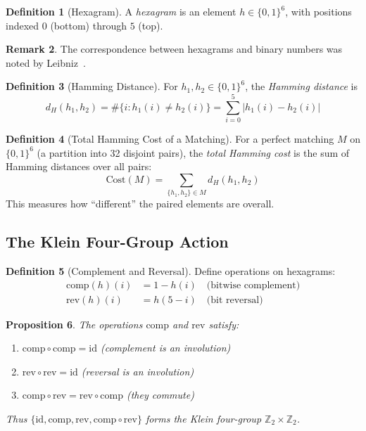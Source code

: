 \documentclass[11pt]{article}
\theoremstyle{definition}
\newtheorem{definition}{Definition}[section]
\newtheorem{remark}[definition]{Remark}
\theoremstyle{plain}
\newtheorem{proposition}[definition]{Proposition}
\newcommand{\Z}{\mathbb{Z}}
\newcommand{\B}{\{0,1\}}
\newcommand{\Ham}{d_H}
\newcommand{\comp}{\mathrm{comp}}
\newcommand{\rev}{\mathrm{rev}}
\begin{document}
\begin{definition}[Hexagram]\label{def:hexagram}
A \emph{hexagram} is an element $h \in \B^6$, with positions indexed $0$ (bottom) through $5$ (top).
\end{definition}

\begin{remark}
The correspondence between hexagrams and binary numbers was noted by Leibniz~\cite{leibniz1703}.
\end{remark}

\begin{definition}[Hamming Distance]
For $h_1, h_2 \in \B^6$, the \emph{Hamming distance} is
\[
\Ham(h_1, h_2) = \#\{i : h_1(i) \neq h_2(i)\} = \sum_{i=0}^{5} |h_1(i) - h_2(i)|
\]
\end{definition}

\begin{definition}[Total Hamming Cost of a Matching]\label{def:totalcost}
For a perfect matching $M$ on $\B^6$ (a partition into 32 disjoint pairs), the \emph{total Hamming cost} is the sum of Hamming distances over all pairs:
\[
\mathrm{Cost}(M) = \sum_{\{h_1, h_2\} \in M} \Ham(h_1, h_2)
\]
This measures how ``different'' the paired elements are overall.
\end{definition}

\subsection{The Klein Four-Group Action}

\begin{definition}[Complement and Reversal]
Define operations on hexagrams:
\begin{align*}
\comp(h)(i) &= 1 - h(i) \quad \text{(bitwise complement)} \\
\rev(h)(i) &= h(5-i) \quad \text{(bit reversal)}
\end{align*}
\end{definition}

\begin{proposition}\label{prop:klein}
The operations $\comp$ and $\rev$ satisfy:
\begin{enumerate}
    \item $\comp \circ \comp = \mathrm{id}$ (complement is an involution)
    \item $\rev \circ \rev = \mathrm{id}$ (reversal is an involution)
    \item $\comp \circ \rev = \rev \circ \comp$ (they commute)
\end{enumerate}
Thus $\{\mathrm{id}, \comp, \rev, \comp \circ \rev\}$ forms the Klein four-group $\Z_2 \times \Z_2$.
\end{proposition}
\end{document}
